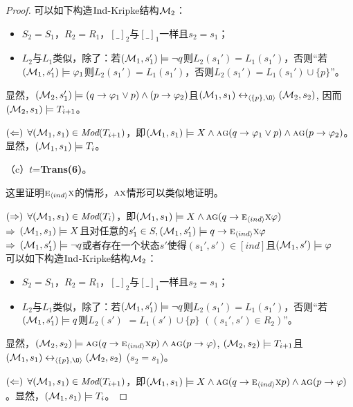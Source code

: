 \begin{proof}
   可以如下构造$\textrm{Ind}$-Kripke结构${\cal M}_2$：
   \begin{itemize}
   	\item $S_2=S_1$，$R_2=R_1$，$[\_]_2$与$[\_]_1$一样且$s_2=s_1$；
   	\item $L_2$与$L_1$类似，除了：若$({\cal M}_1, s_1') \models \neg q$则$L_2(s_1') = L_1(s_1')$，否则“若$({\cal M}_1,s_1') \models \varphi_1$则$L_2(s_1')=L_1(s_1')$，否则$L_2(s_1')=L_1(s_1') \cup \{p\}$”。
   \end{itemize}
   显然，$({\cal M}_2,s_1') \models (q\rightarrow \varphi_1 \vee p) \wedge (p \rightarrow \varphi_2)$且$(\Hm_1, s_1) \lrto_{\tuple{\{p\}, {\O}}} (\Hm_2, s_2)$, 因而$({\cal M}_2,s_1) \models T_{i+1}$。
	
	$(\Leftarrow)$  $\forall ({\cal M}_1, s_1) \in \textit{Mod}(T_{i+1})$，即$({\cal M}_1,s_1) \models X \wedge \textsc{a}\textsc{g} (q\rightarrow \varphi_1 \vee p) \wedge \textsc{a}\textsc{g}(p \rightarrow \varphi_2)$。 显然，$({\cal M}_1, s_1) \models T_i$。
	
	（c）$t$=\textbf{Trans(6)}。
	
	这里证明$\textsc{e}_{{\langle{ind}\rangle}} \textsc{x}$的情形，$\textsc{a} \textsc{x}$情形可以类似地证明。
	
	$(\Rightarrow)$ $\forall({\cal M}_1,s_1) \in \textit{Mod}(T_i)$，即$({\cal M}_1,s_1) \models X \wedge \textsc{a}\textsc{g}(q \rightarrow \textsc{e}_{{\langle{ind}\rangle}}\textsc{x} \varphi)$\\
	$\Rightarrow$ $({\cal M}_1,s_1) \models X$且对任意的$s_1'\in S, ({\cal M}_1,s_1') \models q \rightarrow \textsc{e}_{{\langle{ind}\rangle}} \textsc{x} \varphi$\\
	$\Rightarrow$ $({\cal M}_1,s_1') \models \neg q$或者存在一个状态$s'$使得$(s_1', s') \in [ind]$且$({\cal M}_1,s') \models \varphi$\\
	
	可以如下构造$\textrm{Ind}$-Kripke结构${\cal M}_2$：
	\begin{itemize}
		\item $S_2=S_1$，$R_2=R_1$，$[\_]_2$与$[\_]_1$一样且$s_2=s_1$；
		\item $L_2$与$L_1$类似，除了：若$({\cal M}_1, s_1') \models \neg q$则$L_2(s_1') = L_1(s_1')$，否则“若$({\cal M}_1,s_1') \models q$则$L_2(s')$ $=L_1(s')\cup \{p\}$ $((s_1',s')\in R_2)$”。
	\end{itemize}
	显然，$({\cal M}_2,s_2) \models \textsc{a}\textsc{g}(q\rightarrow \textsc{e}_{{\langle{ind}\rangle}} \textsc{x} p) \wedge \textsc{a}\textsc{g}(p \rightarrow \varphi)$, $({\cal M}_2,s_2) \models T_{i+1}$且$(\Hm_1, s_1) \lrto_{\tuple{\{p\}, {\O}}} (\Hm_2, s_2)$ ($s_2=s_1$)。
	
	$(\Leftarrow)$ $\forall({\cal M}_1, s_1) \in \textit{Mod}(T_{i+1})$，即$({\cal M}_1,s_1) \models X \wedge \textsc{a}\textsc{g}(q\rightarrow \textsc{e}_{{\langle{ind}\rangle}} \textsc{x} p) \wedge \textsc{a}\textsc{g}(p \rightarrow \varphi)$。显然，$({\cal M}_1, s_1) \models T_i$。
\end{proof}

